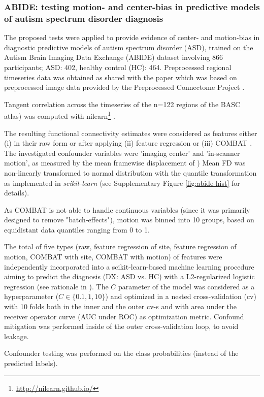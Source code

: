 \documentclass{article}
\begin{document}
\subsubsection*{ABIDE: testing motion- and center-bias in predictive models of autism spectrum disorder diagnosis}

The proposed tests were applied to provide evidence of center- and  motion-bias in diagnostic predictive models of autism spectrum disorder (ASD), trained on the Autism Brain Imaging Data Exchange (ABIDE) dataset \citep{di2014autism} involving 866 participants; ASD: 402, healthy control (HC): 464. Preprocessed regional timeseries data was obtained as shared with the paper \citep{dadi2019benchmarking} which was based on preprocessed image data provided by the Preprocessed Connectome Project \citep{craddock2013neuro}.

Tangent correlation across the timeseries of the n=122 regions of the BASC \citep{bellec2010multi} atlas) was computed with nilearn\footnote{\href{http://nilearn.github.io/}{http://nilearn.github.io/}} \citep{huntenburg2017loading, esteve2015big}. 

The resulting functional connectivity estimates were considered as features either (i) in their raw form or after applying (ii) feature regression \citep{rao2017predictive} or (iii) COMBAT \citep{johnson2007adjusting, fortin2018harmonization}.
The investigated confounder variables were 'imaging center' and 'in-scanner motion', as measured by the mean framewise displacement of \cite{power2014methods})
Mean FD was non-linearly transformed to normal distribution with the quantile transformation \citep{beasley2009rank} as implemented in \emph{scikit-learn} \citep{pedregosa2011scikit} (see Supplementary Figure \ref{fig:abide-hist} for details).

As COMBAT is not able to handle continuous variables (since it was primarily designed to remove "batch-effects"), motion was binned into 10 groups, based on equidistant data quantiles ranging from 0 to 1.

The total of five types (raw, feature regression of site, feature regression of motion, COMBAT with site, COMBAT with motion) of features were independently incorporated into a scikit-learn-based \citep{pedregosa2011scikit} machine learning procedure aiming to predict the diagnosis (DX: ASD vs. HC) with a L2-regularized logistic regression (see rationale in \citep{dadi2019benchmarking}). The $C$ parameter of the model was considered as a hyperparameter ($C \in \{0.1, 1, 10\}$) and optimized in a nested cross-validation (cv) with 10 folds both in the inner and the outer cv-s and with area under the receiver operator curve (AUC under ROC) as optimization metric. Confound mitigation was performed inside of the outer cross-validation loop, to avoid leakage.

Confounder testing was performed on the class probabilities (instead of the predicted labels).




\newpage

\end{document}
